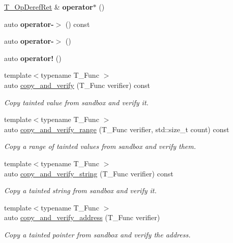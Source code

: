 \begin{DoxyCompactItemize}
$$\item 
\mbox{\label{classrlbox_1_1tainted__base__impl_a8fd7566680b44852f260d8431ee4d196}} 
\hyperlink{classrlbox_1_1tainted__volatile}{T\+\_\+\+Op\+Deref\+Ret} \& {\bfseries operator$\ast$} ()
\item 
\mbox{\label{classrlbox_1_1tainted__base__impl_a3e8fdb261d771cb7b5c9af33fe52ff35}} 
auto {\bfseries operator-\/$>$} () const
\item 
\mbox{\label{classrlbox_1_1tainted__base__impl_a52c2403f1851a0e2d295a712d8d10029}} 
auto {\bfseries operator-\/$>$} ()
\item 
\mbox{\label{classrlbox_1_1tainted__base__impl_a05eaec33cccaad9bc15e014d6c25d695}} 
auto {\bfseries operator!} ()
\item 
{\footnotesize template$<$typename T\+\_\+\+Func $>$ }\\auto \hyperlink{classrlbox_1_1tainted__base__impl_a701759aedd637f48cc97a0e6ada1c8a6}{copy\+\_\+and\+\_\+verify} (T\+\_\+\+Func verifier) const
\begin{DoxyCompactList}\small\item\em Copy tainted value from sandbox and verify it. \end{DoxyCompactList}\item 
{\footnotesize template$<$typename T\+\_\+\+Func $>$ }\\auto \hyperlink{classrlbox_1_1tainted__base__impl_a76e49089d448ba0cfa7ef6d7c1e2d288}{copy\+\_\+and\+\_\+verify\+\_\+range} (T\+\_\+\+Func verifier, std\+::size\+\_\+t count) const
\begin{DoxyCompactList}\small\item\em Copy a range of tainted values from sandbox and verify them. \end{DoxyCompactList}\item 
{\footnotesize template$<$typename T\+\_\+\+Func $>$ }\\auto \hyperlink{classrlbox_1_1tainted__base__impl_aa377cc4d0ea6768ada5032234ac89aab}{copy\+\_\+and\+\_\+verify\+\_\+string} (T\+\_\+\+Func verifier) const
\begin{DoxyCompactList}\small\item\em Copy a tainted string from sandbox and verify it. \end{DoxyCompactList}\item 
{\footnotesize template$<$typename T\+\_\+\+Func $>$ }\\auto \hyperlink{classrlbox_1_1tainted__base__impl_ad34419b3444d0bf37e25ecf7d37fbe0b}{copy\+\_\+and\+\_\+verify\+\_\+address} (T\+\_\+\+Func verifier)
\begin{DoxyCompactList}\small\item\em Copy a tainted pointer from sandbox and verify the address. \end{DoxyCompactList}\end{DoxyCompactItemize}


